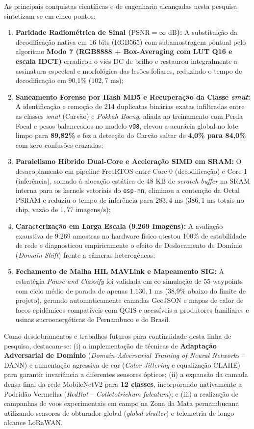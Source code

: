 \documentclass[12pt]{article}
\begin{document}
As principais conquistas científicas e de engenharia alcançadas nesta pesquisa sintetizam-se em cinco pontos:
\begin{enumerate}
    \item \textbf{Paridade Radiométrica de Sinal ($\text{PSNR} = \infty\text{ dB}$):} A substituição da decodificação nativa em 16 bits (RGB565) com subamostragem pontual pelo algoritmo \textbf{Modo 7 (RGB8888 + Box-Averaging com LUT Q16 e escala IDCT)} erradicou o viés DC de brilho e restaurou integralmente a assinatura espectral e morfológica das lesões foliares, reduzindo o tempo de decodificação em 90,1\% ($102,7\text{ ms}$);
    \item \textbf{Saneamento Forense por Hash MD5 e Recuperação da Classe \textit{smut}:} A identificação e remoção de 214 duplicatas binárias exatas infiltradas entre as classes \textit{smut} (Carvão) e \textit{Pokkah Boeng}, aliada ao treinamento com Perda Focal e pesos balanceados no modelo \texttt{v08}, elevou a acurácia global no lote limpo para \textbf{89,82\%} e fez a detecção do Carvão saltar de \textbf{4,0\% para 84,0\%} com zero confusões cruzadas;
    \item \textbf{Paralelismo Híbrido Dual-Core e Aceleração SIMD em SRAM:} O desacoplamento em pipeline FreeRTOS entre Core 0 (decodificação) e Core 1 (inferência), somado à alocação estática de $48\text{ KB}$ de \textit{scratch buffer} na SRAM interna para os kernels vetoriais do \texttt{esp-nn}, eliminou a contenção da Octal PSRAM e reduziu o tempo de inferência para \textbf{$283,4\text{ ms}$} ($386,1\text{ ms}$ totais no chip, vazão de $1,77\text{ imagens/s}$);
    \item \textbf{Caracterização em Larga Escala (9.269 Imagens):} A avaliação exaustiva de 9.269 amostras no hardware físico atestou 100\% de estabilidade de rede e diagnosticou empiricamente o efeito de Deslocamento de Domínio (\textit{Domain Shift}) frente a câmeras heterogêneas;
    \item \textbf{Fechamento de Malha HIL MAVLink e Mapeamento SIG:} A estratégia \textit{Pause-and-Classify} foi validada em co-simulação de 55 waypoints com ciclo médio de parada de apenas \textbf{$1.130,1\text{ ms}$} (38,9\% abaixo do limite de projeto), gerando automaticamente camadas GeoJSON e mapas de calor de focos epidêmicos compatíveis com QGIS e acessíveis a produtores familiares e usinas sucroenergéticas de Pernambuco e do Brasil.
\end{enumerate}

Como desdobramentos e trabalhos futuros para continuidade desta linha de pesquisa, destacam-se: (i) a implementação de técnicas de \textbf{Adaptação Adversarial de Domínio} (\textit{Domain-Adversarial Training of Neural Networks} -- DANN) \parencite{ganin2016domain} e aumentação agressiva de cor (\textit{Color Jittering} e equalização CLAHE) para garantir invariância a diferentes sensores ópticos; (ii) a expansão da camada densa final da rede MobileNetV2 para \textbf{12 classes}, incorporando nativamente a Podridão Vermelha (\textit{RedRot} -- \textit{Colletotrichum falcatum}); e (iii) a realização de campanhas de voos experimentais em campo na Zona da Mata pernambucana utilizando sensores de obturador global (\textit{global shutter}) e telemetria de longo alcance LoRaWAN.

\printbibliography[title={REFERÊNCIAS}]
\end{document}
